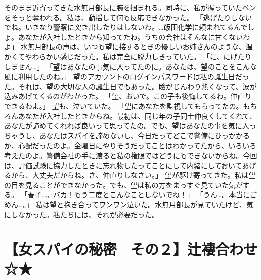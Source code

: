 そのまま近寄ってきた水無月部長に腕を掴まれる。同時に、私が握っていたペンをそっと奪われる。私は、動揺して何も反応できなかった。
「逃げたりしないでね。いきなり警察に突き出したりはしないわ。…飯田化学に頼まれてるんでしょ。あなたが入社したときから知ってたわ。うちの会社はそんなに甘くないわよ」
水無月部長の声は、いつも望に接するときの優しいお姉さんのような、温かくてやわらかい感じだった。私は完全に脱力しきっていた。
「に、にげたりしません…」
「望はあなたの事気に入ってたのに。あなたは、望のことをこんな風に利用したのね。」
望のアカウントのログインパスワードは私の誕生日だった。それは、望の大切な人の誕生日でもあった。瞼がじんわり熱くなって、涙が込みあげてくるのがわかった。
「望、おいで。この子も後悔してるわ。仲直りできるわよ。」
望も、泣いていた。
「望にあなたを監視してもらってたの。もちろんあなたが入社したときからね。最初は、同じ年の子同士仲良くしてくれて、あなたが諦めてくれれば良いって思ってたの。でも、望はあなたの事を気に入っちゃうし、あなたはスパイを諦めないし、今日だってどこで警備にひっかかるか、心配だったのよ。金曜日にやりそうだってことはわかってたから、いろいろ考えたのよ。警備会社の手に渡ると私の権限ではどうにもできないからね。今回は、評価試験に協力したときに忘れ物したってことにして内緒にしておいてあげるから、大丈夫だからね。さ、仲直りしなさい。」
望が駆け寄ってきた。私は望の目を見ることができなかった。でも、望は私の方をまっすぐ見ていた気がする。
「春子…。バカ！もう二度とこんなことしないでね！」
「うん…。本当にごめん…。」
私は望と抱き合ってワンワン泣いた。水無月部長が見ていたけど、気にしなかった。私たちには、それが必要だった。


\section{【女スパイの秘密　その２】辻褄合わせ　☆★}

